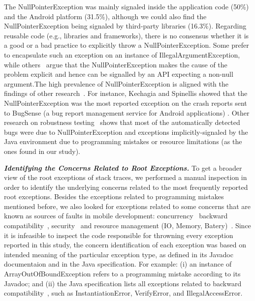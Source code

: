  The NullPointerException was mainly signaled inside the application code (50\%) and the Android platform (31.5\%),
 although we could also find the NullPointerException being signaled by third-party libraries (16.3\%). 
Regarding reusable code (e.g., libraries and frameworks), there is no consensus whether it is a good or a bad practice to 
explicitly throw a NullPointerException. Some prefer to encapsulate such an exception on
an instance of IllegalArgumentException, while others~\cite{bloch2008effective} argue that the
NullPointerException makes the cause of the problem explicit and hence 
can be signalled by an API expecting a non-null argument.The high prevalence of NullPointerException is aligned with the
findings of other 
research~\cite{kim2013predicting,fraser20131600,csallner2004jcrasher,kechagia2014}. 
For instance, Kechagia and Spinellis showed that the NullPointerException was the  
most reported exception on the crash reports sent to BugSense (a bug report 
management service for Android applications)  \cite{kechagia2014}.
Other research on robustness testing~\cite{maji2012empirical,csallner2004jcrasher} shows that most of the automatically 
detected bugs were due to NullPointerException and exceptions
implicitly-signaled by the Java 
environment due to programming mistakes or resource limitations
 (as the ones found in our study).


\emph{\textbf{Identifying the Concerns Related to Root Exceptions.}} To get a broader view of the root exceptions of stack traces,
we performed a manual inspection in order to identify the underlying
concerns related to the most frequently reported root exceptions.
Besides the exceptions related to programming mistakes mentioned before, we also looked for exceptions related to some concerns that are known as sources of faults in mobile development: concurrency~\cite{ama2012} backward compatibility~\cite{McDon13}, security~\cite{enck2011study,was2010} and resource management (IO, Memory, Batery)~\cite{Zhang12}. Since it is infeasible to inspect the code responsible for throwning every exception reported in this study,
the concern identification of each exception was based on intended
meaning of the particular exception type, as defined in 
its Javadoc documentaion and in the Java specification. 
For example: (i) an instance of ArrayOutOfBoundException  
refers to a programming mistake according to its Javadoc; and (ii) the Java specification lists all 
exceptions related to backward compatibility~\cite{javaback}, such as
InstantiationError, VerifyError, and IllegalAccessError.

